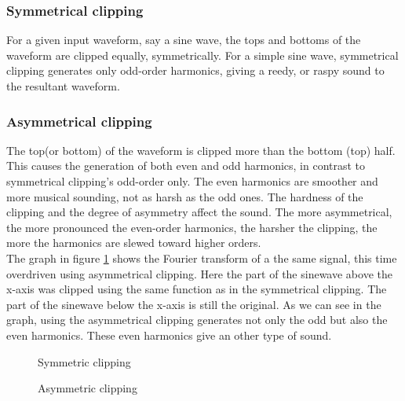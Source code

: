 \subsubsection{Symmetrical clipping}
For a given input waveform, say a sine wave, the tops and bottoms of the waveform are clipped equally, symmetrically. For a simple sine wave, symmetrical clipping generates only odd-order harmonics, giving a reedy, or raspy sound to the resultant waveform. 
\subsubsection{Asymmetrical clipping}
The top(or bottom) of the waveform is clipped more than the bottom (top) half. This causes the generation of both even and odd harmonics, in contrast to symmetrical clipping's odd-order only. The even harmonics are smoother and more musical sounding, not as harsh as the odd ones. The hardness of the clipping and the degree of asymmetry affect the sound. The more asymmetrical, the more pronounced the even-order harmonics, the harsher the clipping, the more the harmonics are slewed toward higher orders. \\
The graph in figure \ref{fig:over5} shows the Fourier transform of a the same signal, this time overdriven using asymmetrical clipping. Here the part of the sinewave above the x-axis was clipped using the same function as in the symmetrical clipping. The part of the sinewave below the x-axis is still the original. As we can see in the graph, using the asymmetrical clipping generates not only the odd but also the even harmonics. These even harmonics give an other type of sound.
\begin{figure}[ht]
  \hfill
  \begin{minipage}[t]{.45\textwidth}
    \begin{center}  
      \caption{Symmetric clipping}
      \label{fig:over4}
    \end{center}
  \end{minipage}
  \hfill
  \begin{minipage}[t]{.45\textwidth}
    \begin{center}  
      \caption{Asymmetric clipping}
      \label{fig:over5}
    \end{center}
  \end{minipage}
  \hfill
\end{figure}
